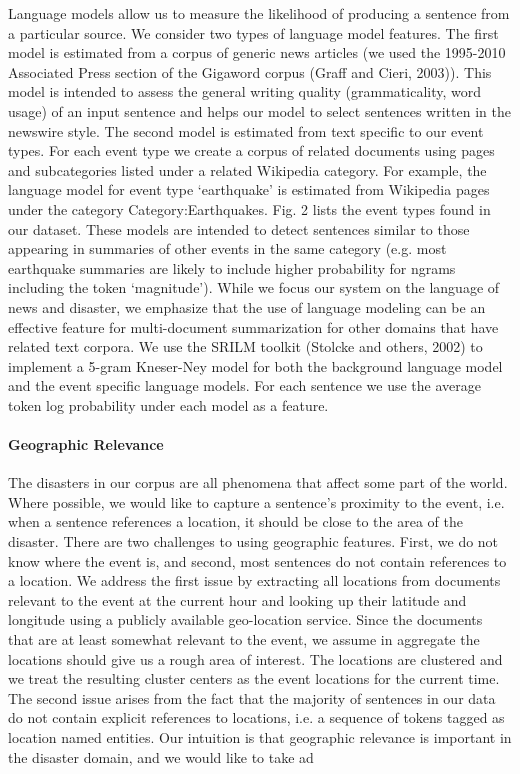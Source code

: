Language models
allow us to measure the likelihood of producing
a sentence from a particular source. We consider
two types of language model features. The first
model is estimated from a corpus of generic news
articles (we used the 1995-2010 Associated Press
section of the Gigaword corpus (Graff and Cieri,
2003)). This model is intended to assess the general
writing quality (grammaticality, word usage)
of an input sentence and helps our model to select
sentences written in the newswire style.
The second model is estimated from text specific
to our event types. For each event type
we create a corpus of related documents using
pages and subcategories listed under a related
Wikipedia category. For example, the language
model for event type ‘earthquake’ is estimated
from Wikipedia pages under the category Category:Earthquakes.
Fig. 2 lists the event types
found in our dataset. These models are intended
to detect sentences similar to those appearing in
summaries of other events in the same category
(e.g. most earthquake summaries are likely to include
higher probability for ngrams including the
token ‘magnitude’). While we focus our system on
the language of news and disaster, we emphasize
that the use of language modeling can be an effective
feature for multi-document summarization for
other domains that have related text corpora.
We use the SRILM toolkit (Stolcke and others,
2002) to implement a 5-gram Kneser-Ney model
for both the background language model and the
event specific language models. For each sentence
we use the average token log probability under
each model as a feature.



\paragraph{Geographic Relevance} The disasters
in our corpus are all phenomena that affect some
part of the world. Where possible, we would like
to capture a sentence’s proximity to the event, i.e.
when a sentence references a location, it should be
close to the area of the disaster.
There are two challenges to using geographic
features. First, we do not know where the event is,
and second, most sentences do not contain references
to a location. We address the first issue by
extracting all locations from documents relevant to
the event at the current hour and looking up their
latitude and longitude using a publicly available
geo-location service. Since the documents that are
at least somewhat relevant to the event, we assume
in aggregate the locations should give us a rough
area of interest. The locations are clustered and
we treat the resulting cluster centers as the event
locations for the current time.
The second issue arises from the fact that the
majority of sentences in our data do not contain
explicit references to locations, i.e. a sequence of
tokens tagged as location named entities. Our intuition
is that geographic relevance is important in
the disaster domain, and we would like to take ad


